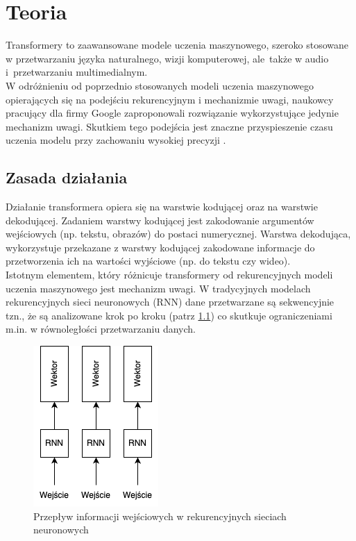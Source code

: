 \documentclass[12pt,a4paper,twoside]{book} %
\begin{document}
\chapter{Teoria}

Transformery to zaawansowane modele uczenia maszynowego, szeroko stosowane w przetwarzaniu języka naturalnego, wizji komputerowej, ale~także w audio i~przetwarzaniu multimedialnym. \\ 
W odróżnieniu od poprzednio stosowanych modeli uczenia maszynowego opierających się na podejściu rekurencyjnym i mechanizmie uwagi, naukowcy pracujący dla firmy Google zaproponowali rozwiązanie wykorzystujące jedynie mechanizm uwagi. Skutkiem tego podejścia jest znaczne przyspieszenie czasu uczenia modelu przy zachowaniu wysokiej precyzji \cite{vaswani2023attentionneed}.
\section{Zasada działania}
Działanie transformera opiera się na warstwie kodującej oraz na warstwie dekodującej.
Zadaniem warstwy kodującej jest zakodowanie argumentów wejściowych (np. tekstu, obrazów) do postaci numerycznej. Warstwa dekodująca, wykorzystuje przekazane z warstwy kodującej zakodowane informacje do przetworzenia ich na wartości wyjściowe (np. do tekstu czy wideo). \\
Istotnym elementem, który różnicuje transformery od rekurencyjnych modeli uczenia maszynowego jest mechanizm uwagi. W tradycyjnych modelach rekurencyjnych sieci neuronowych (RNN) dane przetwarzane są sekwencyjnie tzn., że są analizowane krok po kroku (patrz \ref{fig:rnn_schema}) \cite{mamczur2020} co skutkuje ograniczeniami m.in. w równoległości przetwarzaniu danych.

\begin{figure}[h]
    \centering
	\includegraphics[scale=0.75]{figs/rnn.png}
	\caption{Przepływ informacji wejściowych w rekurencyjnych sieciach neuronowych}
	\label{fig:rnn_schema}
\end{figure}
\end{document}
